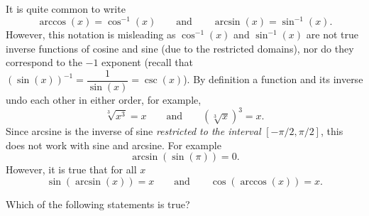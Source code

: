 \documentclass{ximera}
\begin{document}
It is quite common to write
\[
\arccos(x) = \cos^{-1}(x)\qquad\text{and}\qquad\arcsin(x) = \sin^{-1}(x).
\]
However, this notation is misleading as $\cos^{-1}(x)$ and
$\sin^{-1}(x)$ are not true inverse functions of cosine and sine (due to the restricted domains), nor do they correspond to the $-1$ exponent (recall that $(\sin(x))^{-1}=\dfrac{1}{\sin(x)}=\csc(x)$).
By definition a function and its inverse undo each other in either
order, for example,
\[
\sqrt[3]{x^3}=x\qquad \text{and}\qquad \left(\sqrt[3]{x}\right)^3=x. 
\]
Since arcsine is the inverse of sine \emph{restricted to the interval}
$[-\pi/2,\pi/2]$, this does not work with sine and arcsine. For
example
\[
\arcsin(\sin(\pi))=0.
\]
However, it is true that for all $x$
\[
\sin(\arcsin(x)) = x\qquad\text{and}\qquad\cos(\arccos(x)) = x.
\]
\begin{question}
   Which of the following statements is true?
   \begin{multipleChoice}
   \end{multipleChoice}  
\end{question}
\end{document}

